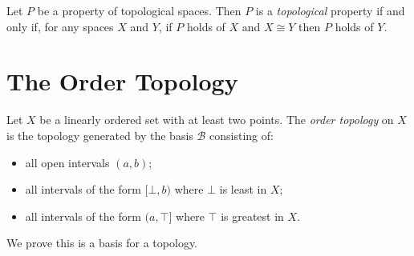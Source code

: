 \begin{definition}
    Let $P$ be a property of topological spaces. Then $P$ is a \emph{topological} property if and only if,
    for any spaces $X$ and $Y$, if $P$ holds of $X$ and $X \cong Y$ then $P$ holds of $Y$.
\end{definition}

\section{The Order Topology}

\begin{definition}
    Let $X$ be a linearly ordered set with at least two points. The \emph{order topology} on $X$ is the topology
    generated by the basis $\mathcal{B}$ consisting of:
    \begin{itemize}
        \item all open intervals $(a,b)$;
        \item all intervals of the form $[\bot,b)$ where $\bot$ is least in $X$;
        \item all intervals of the form $(a,\top]$ where $\top$ is greatest in $X$.
    \end{itemize}
\end{definition}

We prove this is a basis for a topology.

